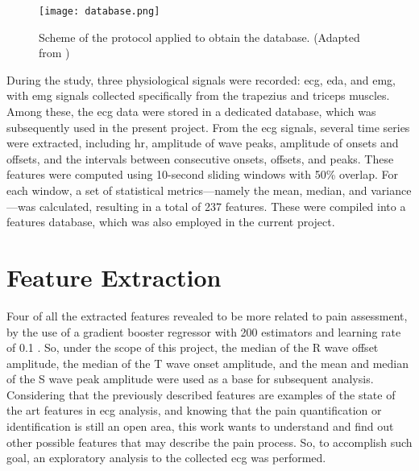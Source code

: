 \begin{figure}[h!]
    \centering
    \texttt{[image: database.png]}
    \caption{Scheme of the protocol applied to obtain the database. (Adapted from \cite{Alves2024})}
    \label{fig:database}
\end{figure}

During the study, three physiological signals were recorded: \ac{ecg}, \ac{eda}, and \ac{emg}, with \ac{emg} signals collected specifically from the trapezius and triceps muscles. Among these, the \ac{ecg} data were stored in a dedicated database, which was subsequently used in the present project.
From the \ac{ecg} signals, several time series were extracted, including \ac{hr}, amplitude of wave peaks, amplitude of onsets and offsets, and the intervals between consecutive onsets, offsets, and peaks. These features were computed using 10-second sliding windows with 50\% overlap.
For each window, a set of statistical metrics—namely the mean, median, and variance—was calculated, resulting in a total of 237 features. These were compiled into a features database, which was also employed in the current project. 





\section{Feature Extraction}
Four of all the extracted features revealed to be more related to pain assessment, by the use of a gradient booster regressor with 200 estimators and learning rate of 0.1 \cite{Alves2024}. So, under the scope of this project, the median of the R wave offset amplitude, the median of the T wave onset amplitude, and the mean and median of the S wave peak amplitude were used as a base for subsequent analysis.
Considering that the previously described features are examples of the state of the art features in \ac{ecg} analysis, and knowing that the pain quantification or identification is still an open area, this work wants to understand and find out other possible features that may describe the pain process. So, to accomplish such goal, an exploratory analysis to the collected \ac{ecg} was performed.


